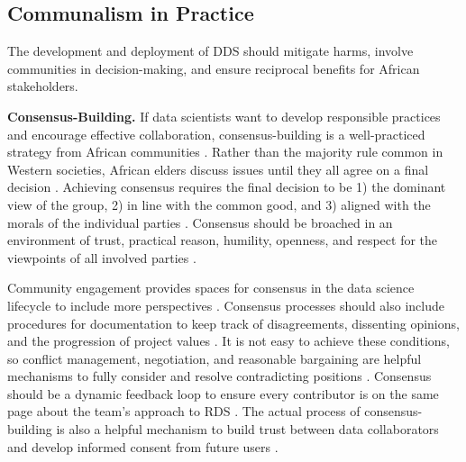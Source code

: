 \subsection{Communalism in Practice} 
The development and deployment of DDS should mitigate harms, involve communities in decision-making, and ensure reciprocal benefits for African stakeholders. 

\textbf{Consensus-Building.} 
If data scientists want to develop responsible practices and encourage effective collaboration, consensus-building is a well-practiced strategy from African communities \cite{wiredu2004moralfoundations}. Rather than the majority rule common in Western societies, African elders discuss issues until they all agree on a final decision \cite{wiredu2004akan,carman2023applying}. Achieving consensus requires the final decision to be 1) the dominant view of the group, 2) in line with the common good, and 3) aligned with the morals of the individual parties \cite{coetzee2004particularity}. Consensus should be broached in an environment of trust, practical reason, humility, openness, and respect for the viewpoints of all involved parties \cite{coetzee2004particularity,nwankwo2019africa,gwagwa2019recommendations,mhlambi2020from, okolo2023responsible, gwagwa2022role}. 

Community engagement provides spaces for consensus in the data science lifecycle to include more perspectives \cite{day2023data,mabe2007security}. Consensus processes should also include procedures for documentation to keep track of disagreements, dissenting opinions, and the progression of project values \cite{kling2023role}. It is not easy to achieve these conditions, so conflict management, negotiation, and reasonable bargaining are helpful mechanisms to fully consider and resolve contradicting positions \cite{gwagwa2019recommendations, osaghae2004rescuing, dieng2023speaking}. Consensus should be a dynamic feedback loop to ensure every contributor is on the same page about the team's approach to RDS \cite{segun2021critically, nwankwo2019africa, uzomah2023african, kohnert2022machine, abebe2021narratives, gwagwa2019recommendations, dignum2023responsible}. The actual process of consensus-building is also a helpful mechanism to build trust between data collaborators and develop informed consent from future users \cite{nwankwo2019africa,kohnert2022machine,abebe2021narratives}.

